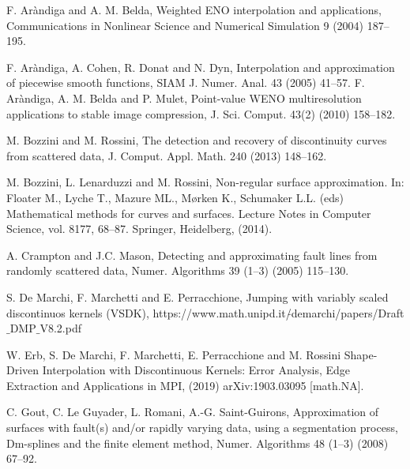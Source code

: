 \documentclass[xcolor=dvipsnames,9pt,mathserif]{beamer}
\begin{document}
\begin{thebibliography}{10}
{ F. Ar\`andiga and A. M. Belda}, Weighted ENO interpolation and applications, Communications in Nonlinear Science
and Numerical Simulation 9 (2004) 187--195.

 F. Ar\`andiga, A. Cohen, R. Donat and N. Dyn, Interpolation and approximation of piecewise smooth functions, SIAM J. Numer. Anal. 43 (2005) 41--57.
{ F. Ar\`andiga, A. M. Belda and P. Mulet},
Point-value {WENO} multiresolution applications to stable image compression, J. Sci. Comput. 43(2) (2010) 158--182.

M. Bozzini and M. Rossini, The detection and recovery of discontinuity curves from scattered data, J. Comput. Appl. Math. 240 (2013) 148--162.

 M. Bozzini, L. Lenarduzzi and M. Rossini, Non-regular surface approximation. In:  Floater M., Lyche T., Mazure ML., M{\o}rken K., Schumaker L.L. (eds) Mathematical methods for curves and surfaces. Lecture Notes in Computer Science, vol. 8177, 68--87. Springer, Heidelberg, (2014).

A. Crampton and J.C. Mason, Detecting and approximating fault lines from randomly scattered data, Numer. Algorithms 39 (1–3) (2005) 115--130.

S. De Marchi, F. Marchetti and E. Perracchione, Jumping with variably scaled discontinuos kernels (VSDK),
https://www.math.unipd.it/$\tilde{}$demarchi/papers/Draft$\_$DMP$\_$V8.2.pdf



 W. Erb, S. De Marchi, F. Marchetti, E. Perracchione and M. Rossini Shape-Driven Interpolation with Discontinuous Kernels: Error Analysis, Edge Extraction and Applications in MPI, (2019) arXiv:1903.03095 [math.NA].


C. Gout, C. Le Guyader, L. Romani, A.-G. Saint-Guirons, Approximation of surfaces with fault(s) and/or rapidly varying data, using a segmentation process, Dm-splines and the finite element method, Numer. Algorithms 48 (1–3) (2008) 67--92.


\end{thebibliography}
\end{document}
